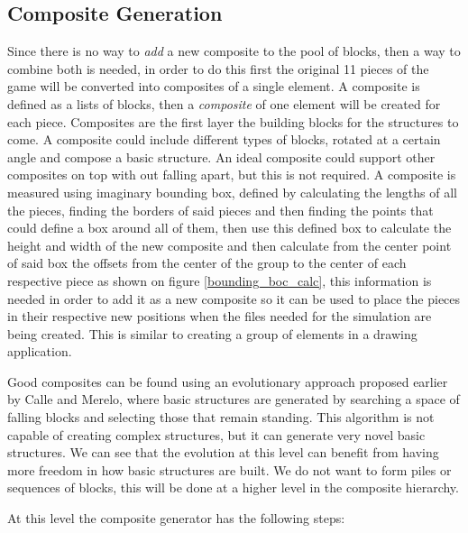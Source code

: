 \documentclass[conference]{IEEEtran}
\begin{document}
    \subsection{Composite Generation}

    Since there is no way to \textit{add} a new composite to the pool of blocks,
    then a way to combine both is needed, in order to do this first the original
    11 pieces of the game will be converted into composites of a single element.
    A composite is defined as a lists of blocks, then a \textit{composite} of
    one element will be created for each piece. Composites are the first layer
    the building blocks for the structures to come. A composite could include
    different types of blocks, rotated at a certain angle and compose a basic
    structure. An ideal composite could support other composites on top with out
    falling apart, but this is not required. A composite is measured using
    imaginary bounding box, defined by calculating the lengths of all the pieces,
    finding the borders of said pieces and then finding the points that could
    define a box around all of them, then use this defined box to calculate the
    height and width of the new composite and then calculate from the center
    point of said box the offsets from the center of the group to the center of
    each respective piece as shown on figure \ref{bounding_boc_calc}, this
    information is needed in order to add it as a new composite so it can be
    used to place the pieces in their respective new positions when the files
    needed for the simulation are being created. This is similar to creating a
    group of elements in a drawing application.

    Good composites can be found using an evolutionary approach proposed earlier 
    by Calle and Merelo, where basic structures are generated by searching a space
    of falling blocks and selecting those that remain standing. This algorithm is 
    not capable of creating complex structures, but it can generate very novel basic
    structures. We can see that the evolution at this level can benefit from having
    more freedom in how basic structures are built. We do not want to form piles
    or sequences of blocks, this will be done at a higher level in the composite hierarchy.
    
    At this level the composite generator has the following steps:
    
    
\end{document}
